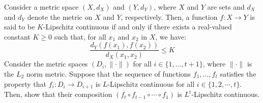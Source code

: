 \vspace{0.5cm}

 Consider a metric space $(X, d_X)$ and $(Y, d_Y)$, where $X$ and $Y$ are sets and $d_X$ and $d_Y$ denote the metric on $X$ and $Y$, respectively. Then, a function $f:X\to Y$ is said to be $K$-Lipschitz continuous if and only if there exists a real-valued constant $K\geq 0$ such that, for all $x_1$ and $x_2$ in $X$, we have:
\[\frac{d_Y(f(x_1), f(x_2))}{d_X(x_1, x_2)} \leq K\]
Consider the metric spaces $(D_i, \|\cdot\|)$ for all $i\in\{1, \dots, t+1\}$, where $\|\cdot\|$ is the $L_2$ norm metric. Suppose that the sequence of functions $f_1, \dots, f_t$ satisfies the property that $f_i: D_i \to D_{i+1}$ is $L$-Lipschitz continuous for all $i \in \{1, 2, \cdots, t\}$. Then, show that their composition $(f_t \circ f_{t-1} \circ \cdots \circ f_1)$ is $L^t$-Lipschitz continuous.\\

\begin{solution}
    
\end{solution}


